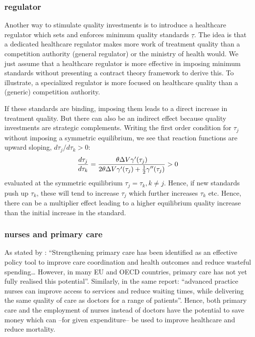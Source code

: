 \documentclass[a4paper,12pt]{article}
\begin{document}
\subsubsection{regulator}
\label{sec:org2d39a31}

Another way to stimulate quality investments is to introduce a healthcare regulator which sets and enforces minimum quality standards \(\underline \tau\). The idea is that a dedicated healthcare regulator makes more work of treatment quality than a competition authority (general regulator) or the ministry of health would. We just assume that a healthcare regulator is more effective in imposing minimum standards without presenting a contract theory framework to derive this. To illustrate, a specialized regulator is more focused on healthcare quality than a (generic) competition authority.

If these standards are binding, imposing them leads to a direct increase in treatment quality. But there can also be an indirect effect because quality investments are strategic complements. Writing the first order condition for \(\tau_j\) without imposing a symmetric equilibrium, we see that reaction functions are upward sloping, \(d \tau_j/d \tau_k > 0\):
\begin{equation}
\label{eq:28}
\frac{d\tau_j}{d\tau_k} = \frac{\theta \Delta V \gamma'(\tau_j)}{2\theta\Delta V \gamma'(\tau_j) + \textstyle{1\over 2} \gamma''(\tau_j)} > 0
\end{equation}
evaluated at the symmetric equilibrium \(\tau_j=\tau_k, k \neq j\). Hence, if new standards push up \(\tau_k\), these will tend to increase \(\tau_j\) which further increases \(\tau_k\) etc. Hence, there can be a multiplier effect leading to a higher equilibrium quality increase than the initial increase in the standard.

\subsubsection{nurses and primary care}
\label{sec:org6d2ac06}

As stated by \cite{OECD_2020}: ``Strengthening primary care has been identified as an effective policy tool to improve care coordination and health outcomes and reduce wasteful spending\ldots{} However, in many EU and OECD countries, primary care has not yet fully realised this potential''. Similarly, in the same report: ``advanced practice nurses can improve access to services and reduce waiting times, while delivering the same quality of care as doctors for a range of patients''. Hence, both primary care and the employment of nurses instead of doctors have the potential to save money which can --for given expenditure-- be used to improve healthcare and reduce mortality.
\end{document}
